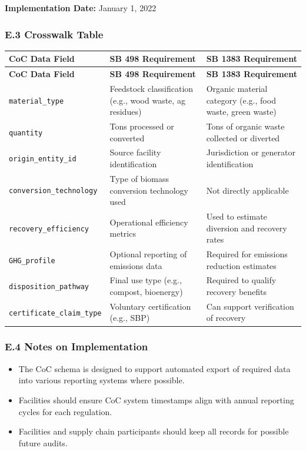 \documentclass{article}
\begin{document}
\textbf{Implementation Date:} January 1, 2022

\subsubsection*{E.3 Crosswalk Table}

{\footnotesize
\begin{longtable}{|p{4cm}|p{5cm}|p{5cm}|}
\hline
\textbf{CoC Data Field} & \textbf{SB 498 Requirement} & \textbf{SB 1383 Requirement} \\
\hline
\endfirsthead
\hline
\textbf{CoC Data Field} & \textbf{SB 498 Requirement} & \textbf{SB 1383 Requirement} \\
\hline
\endhead
\texttt{material\_type} & Feedstock classification (e.g., wood waste, ag residues) & Organic material category (e.g., food waste, green waste) \\
\texttt{quantity} & Tons processed or converted & Tons of organic waste collected or diverted \\
\texttt{origin\_entity\_id} & Source facility identification & Jurisdiction or generator identification \\
\texttt{conversion\_technology} & Type of biomass conversion technology used & Not directly applicable \\
\texttt{recovery\_efficiency} & Operational efficiency metrics & Used to estimate diversion and recovery rates \\
\texttt{GHG\_profile} & Optional reporting of emissions data & Required for emissions reduction estimates \\
\texttt{disposition\_pathway} & Final use type (e.g., compost, bioenergy) & Required to qualify recovery benefits \\
\texttt{certificate\_claim\_type} & Voluntary certification (e.g., SBP) & Can support verification of recovery \\
\hline
\end{longtable}
}

\subsubsection*{E.4 Notes on Implementation}

\begin{itemize}[noitemsep]
    \item The CoC schema is designed to support automated export of required data into various reporting systems where possible.
    \item Facilities should ensure CoC system timestamps align with annual reporting cycles for each regulation.
    \item Facilities and supply chain participants should keep all records for possible future audits.
\end{itemize}
\end{document}
